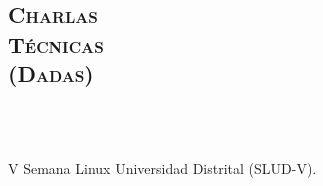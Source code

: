 \begin{resume}
   



\section{\textsc{Charlas \\ T\'{e}cnicas \\ (Dadas)}}

\begin{formatb}
  \\
  \\
   \body
\end{formatb}

\begin{position}
V Semana Linux Universidad Distrital (SLUD-V).
\end{position}



\end{resume}
